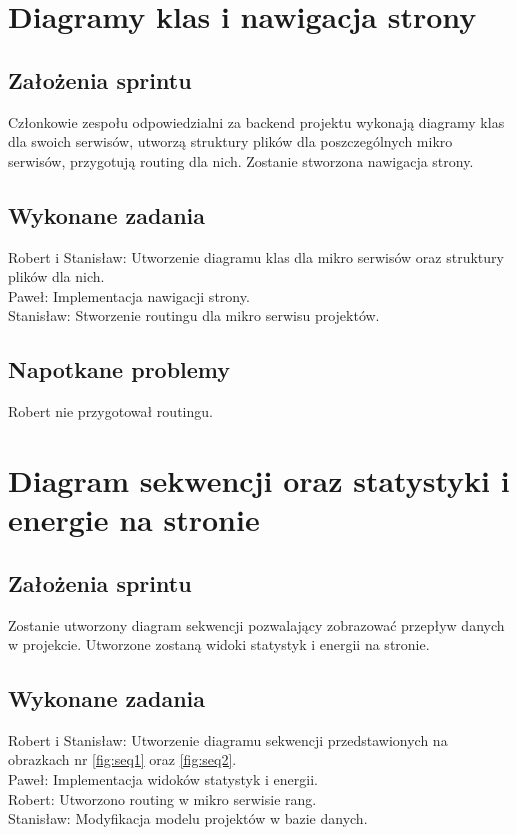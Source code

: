 \documentclass[a4paper,11pt]{report}
\begin{document}
\section {Diagramy klas i nawigacja strony}
\subsection {Założenia sprintu}
Członkowie zespołu odpowiedzialni za backend projektu wykonają diagramy klas dla swoich serwisów, utworzą struktury plików dla poszczególnych mikro serwisów, przygotują routing dla nich. Zostanie stworzona nawigacja strony.
\subsection {Wykonane zadania}
Robert i Stanisław: Utworzenie diagramu klas dla mikro serwisów oraz struktury plików dla nich.\\
Paweł: Implementacja nawigacji strony. \\
Stanisław: Stworzenie routingu dla mikro serwisu projektów.\\
\subsection {Napotkane problemy}
Robert nie przygotował routingu.

\section {Diagram sekwencji oraz statystyki i energie na stronie}
\label{sec:system_statystyk}
\subsection {Założenia sprintu}
Zostanie utworzony diagram sekwencji pozwalający zobrazować przepływ danych w projekcie. Utworzone zostaną widoki statystyk i energii na stronie.
\subsection {Wykonane zadania}
Robert i Stanisław: Utworzenie diagramu sekwencji przedstawionych na obrazkach nr \ref{fig:seq1} oraz \ref{fig:seq2}.\\
Paweł: Implementacja widoków statystyk i energii. \\
Robert: Utworzono routing w mikro serwisie rang.\\
Stanisław: Modyfikacja modelu projektów w bazie danych.\\
\end{document}

